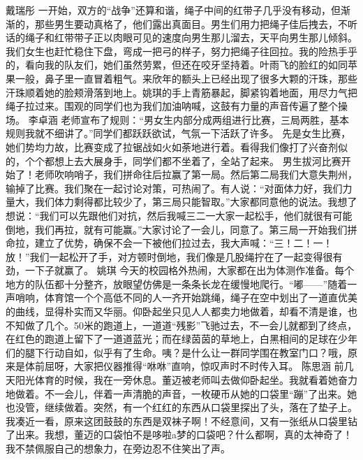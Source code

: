 {}戴瑞彤\markdownRendererInterblockSeparator
{}一开始，双方的“战争”还算和谐，绳子中间的红带子几乎没有移动，但渐渐的，那些男生要动真格了，他们露出真面目。男生们用力把绳子佳后拽去，不听话的绳子和红带带子正以肉眼可见的速度向男生那儿溜去，天平向男生那儿倾斜。\markdownRendererInterblockSeparator
{}我们女生也赶忙稳住下盘，弯成一把弓的样子，努力把绳子往回拉。我的险热手乎的，看向我的队友们，她们虽然劳累，但还在咬牙坚持着。叶雨飞的脸红的如同苹果一般，鼻子里一直冒着粗气。来欣年的额头上已经出现了很多大颗的汗珠，那些汗珠顺着她的脸颊滑落到地上。姚琪的手上青筋暴起，脚紧钩着地面，用尽力气把绳子拉过来。围观的同学们也为我们加油呐喊，这鼓有力量的声音传遍了整个操场。\markdownRendererInterblockSeparator
{}\markdownRendererInterblockSeparator
{}李卓涵\markdownRendererInterblockSeparator
{}老师宣布了规则：“男女生内部分成两组进行比赛，三局两胜，基本规则我就不细讲了。”同学们都跃跃欲试，气氛一下活跃了许多。\markdownRendererInterblockSeparator
{}先是女生比赛，她们势均力故，比赛变成了拉锯战如火如荼地进行着。看得我们像打了兴奋剂似的，个个都想上去大展身手，同学们都不坐着了，全站了起来。\markdownRendererInterblockSeparator
{}男生拔河比赛开始了！老师吹响哨子，我们拼命往后拉赢了第一局。然后第二局我们大意失荆州，输掉了比赛。我们聚在一起讨论对策，可热闹了。有人说：“对面体力好，我们力量大，我们体力剩得都比较少了，第三局只能智取。”大家都同意他的说法。我想了想说：“我们可以先跟他们对抗，然后我喊三二一大家一起松手，他们就很有可能倒地，我们再拉，就有可能赢。”大家讨论了一会儿，同意了。第三局一开始我们拼命拉，建立了优势，确保不会一下被他们拉过去，我大声喊：“三！二！一！放！”我们一起松开了手，对方顿时倒地，我们像是几股绳拧在了一起变得很有劲，一下子就赢了。\markdownRendererInterblockSeparator
{}\markdownRendererInterblockSeparator
{}姚琪\markdownRendererInterblockSeparator
{}今天的校园格外热闹，大家都在出为体测作准备。每个地方的队伍都十分整齐，放眼望仿佛是一条条长龙在缓慢地爬行。“嘟——”随着一声哨响，体育馆一个个高低不同的人一齐开始跳绳，绳子在空中划出了一道直优美的曲线，显得朴实而又华丽。仰卧起坐只见人人都卖力地做着，却看不清是谁，也不知做了几个。50米的跑道上，一道道“残影”飞驰过去，不一会儿就都到了终点，在红色的跑道上留下了一道道蓝光；而在绿茵茵的草地上，白黑相间的足球在少年们的腿下行动自如，似乎有了生命。咦？是什么让一群同学围在教室门口？哦，原来是体前屈呀，大家把仪器推得“咻咻”直响，惊叹声时不时传入耳。\markdownRendererInterblockSeparator
{}\markdownRendererInterblockSeparator
{}陈思涵\markdownRendererInterblockSeparator
{}前几天阳光体育的时候，我在一旁休息。董迈被老师叫去做仰卧起坐。我就看着她奋力地做着。不一会儿，伴着一声清脆的声音，一枚硬币从她的口袋里“蹦”了出来。她也没管，继续做着。突然，有一个红红的东西从口袋里探出了头，落在了垫子上。我凑近一看，原来这团鼓鼓的东西是双袜子啊！不经意间，又有一张纸从口袋里钻了出来。我想，董迈的口袋怕不是哆啦a梦的口袋吧？什么都啊，真的太神奇了！我不禁佩服自己的想象力，在旁边忍不住笑出了声。\markdownRendererDocumentEnd